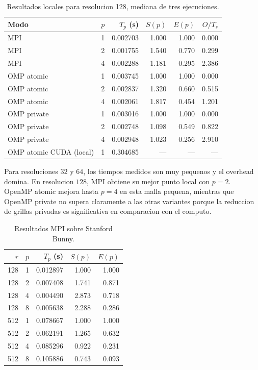 \documentclass[conference]{IEEEtran}
\begin{document}
\begin{table}[t]
    \centering
    \caption{Resultados locales para resolucion 128, mediana de tres ejecuciones.}
    \begin{tabular}{lrrrrr}
        \toprule
        Modo        & $p$ & $T_p$ (s) & $S(p)$ & $E(p)$ & $O/T_s$ \\
        \midrule
        MPI         & 1   & 0.002703  & 1.000  & 1.000  & 0.000   \\
        MPI         & 2   & 0.001755  & 1.540  & 0.770  & 0.299   \\
        MPI         & 4   & 0.002288  & 1.181  & 0.295  & 2.386   \\
        OMP atomic  & 1   & 0.003745  & 1.000  & 1.000  & 0.000   \\
        OMP atomic  & 2   & 0.002837  & 1.320  & 0.660  & 0.515   \\
        OMP atomic  & 4   & 0.002061  & 1.817  & 0.454  & 1.201   \\
        OMP private & 1   & 0.003016  & 1.000  & 1.000  & 0.000   \\
        OMP private & 2   & 0.002748  & 1.098  & 0.549  & 0.822   \\
        OMP private & 4   & 0.002948  & 1.023  & 0.256  & 2.910   \\
        OMP atomic CUDA (local) & 1 & 0.304685 & --- & --- & ---   \\
        \bottomrule
    \end{tabular}
\end{table}

Para resoluciones $32$ y $64$, los tiempos medidos son muy pequenos y el
overhead domina. En resolucion $128$, MPI obtiene su mejor punto local con
$p=2$. OpenMP atomic mejora hasta $p=4$ en esta malla pequena, mientras que
OpenMP private no supera claramente a las otras variantes porque la reduccion de
grillas privadas es significativa en comparacion con el computo.

\begin{table}[t]
    \centering
    \caption{Resultados MPI sobre Stanford Bunny.}
    \begin{tabular}{rrrrr}
        \toprule
        $r$ & $p$ & $T_p$ (s) & $S(p)$ & $E(p)$ \\
        \midrule
        128 & 1 & 0.012897 & 1.000 & 1.000 \\
        128 & 2 & 0.007408 & 1.741 & 0.871 \\
        128 & 4 & 0.004490 & 2.873 & 0.718 \\
        128 & 8 & 0.005638 & 2.288 & 0.286 \\
        512 & 1 & 0.078667 & 1.000 & 1.000 \\
        512 & 2 & 0.062191 & 1.265 & 0.632 \\
        512 & 4 & 0.085296 & 0.922 & 0.231 \\
        512 & 8 & 0.105886 & 0.743 & 0.093 \\
        \bottomrule
    \end{tabular}
\end{table}
\end{document}

